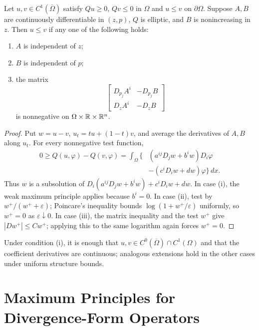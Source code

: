 \begin{theorem}
\label{gilbarg-trudinger.thm.10.7.comparison-divergence-form}
Let $u,v\in C^1(\overline\Omega)$ satisfy $Qu\ge0$, $Qv\le0$ in
$\Omega$ and $u\le v$ on $\partial\Omega$.  Suppose $A,B$ are
continuously differentiable in $(z,p)$, $Q$ is elliptic, and $B$ is
nonincreasing in $z$.  Then $u\le v$ if any one of the following holds:
\begin{enumerate}
\item[(i)] $A$ is independent of $z$;
\item[(ii)] $B$ is independent of $p$;
\item[(iii)] the matrix
\[
\begin{bmatrix}
D_{p_j}A^i&-D_{p_j}B\\
D_zA^i&-D_zB
\end{bmatrix}
\]
is nonnegative on $\Omega\times\mathbb{R}\times\mathbb{R}^n$.
\end{enumerate}
\end{theorem}
\begin{proof}
\sketch Put $w=u-v$, $u_t=tu+(1-t)v$, and average the derivatives of
$A,B$ along $u_t$.  For every nonnegative test function,
\begin{equation}
\begin{aligned}
0\ge Q(u,\varphi)-Q(v,\varphi)
=\int_\Omega\{&(a^{ij}D_jw+b^iw)D_i\varphi\\
&-(c^iD_iw+dw)\varphi\}\,dx.
\end{aligned}
\tag{10.22}
\end{equation}
Thus $w$ is a subsolution of
$D_i(a^{ij}D_jw+b^iw)+c^iD_iw+dw$.  In case \textup{(i)}, the weak
maximum principle applies because $b^i=0$.  In case \textup{(ii)}, test by
$w^+/(w^++\varepsilon)$; Poincare's inequality bounds
$\log(1+w^+/\varepsilon)$ uniformly, so $w^+=0$ as
$\varepsilon\downarrow0$.  In case \textup{(iii)}, the matrix inequality
and the test $w^+$ give $|Dw^+|\le Cw^+$; applying this to the same
logarithm again forces $w^+=0$.
\end{proof}

Under condition \textup{(i)}, it is enough that
$u,v\in C^0(\overline\Omega)\cap C^1(\Omega)$ and that the coefficient
derivatives are continuous; analogous extensions hold in the other cases
under uniform structure bounds.

\section{Maximum Principles for Divergence-Form Operators}

